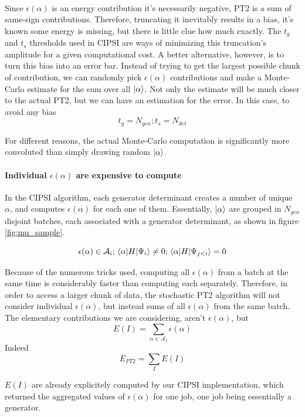 \documentclass[./thesis.tex]{subfiles}
\begin{document}
\paragraph{}  Since $\epsilon	(\alpha)$ is an energy contribution it's necessarily negative, PT2 is a sum of same-sign contributions. Therefore, truncating it inevitably results in a bias, it's known some energy is missing, but there is little clue how much exactly. The $t_g$ and $t_s$ thresholds used in CIPSI are ways of minimizing this truncation's amplitude for a given computational cost.
A better alternative, however, is to turn this bias into an error bar. Instead of trying to get the largest possible chunk of contribution, we can randomly pick $\epsilon(\alpha)$ contributions and make a Monte-Carlo estimate for the sum over all $\ket \alpha$. Not only the estimate will be much closer to the actual PT2, but we can have an estimation for the error. In this case, to avoid any bias
$$t_g = N_{gen} ; t_s = N_{det}$$

For different reasons, the actual Monte-Carlo computation is significantly more convoluted than simply drawing random $\ket \alpha$.

\paragraph{Individual $\epsilon(\alpha)$ are expensive to compute}
In the CIPSI algorithm, each generator determinant creates a number of unique $\alpha$, and computes $\epsilon(\alpha)$ for each one of them.
Essentially, $\ket \alpha$ are grouped in $N_{gen}$ disjoint batches, each associated with a generator determinant, as shown in figure \ref{fig:mu_sample}.

	$$\epsilon(\alpha) \in \mathcal{A}_i ; \mel{\alpha}{H}{\Psi_i} \neq 0 ; \mel{\alpha}{H}{\Psi_{j<i}} =0 $$

Because of the numerous tricks used, computing all $\epsilon(\alpha)$ from a batch at the same time is considerably faster than computing each separately. Therefore, in order to access a larger chunk of data, the stochastic PT2 algorithm will not consider individual $\epsilon(\alpha)$, but instead sums of all $\epsilon(\alpha)$ from the same batch.
The elementary contributions we are considering, aren't $\epsilon(\alpha)$, but
	$$E(I) = \sum_{\alpha \in \mathcal{A}_I} \epsilon(\alpha)$$
Indeed
    $$E_{PT2} = \sum_{I} E(I)$$
    
$E(I)$ are already explicitely computed by our CIPSI implementation, which returned the aggregated values of $\epsilon(\alpha)$ for one job, one job being essentially a generator.
\end{document}
